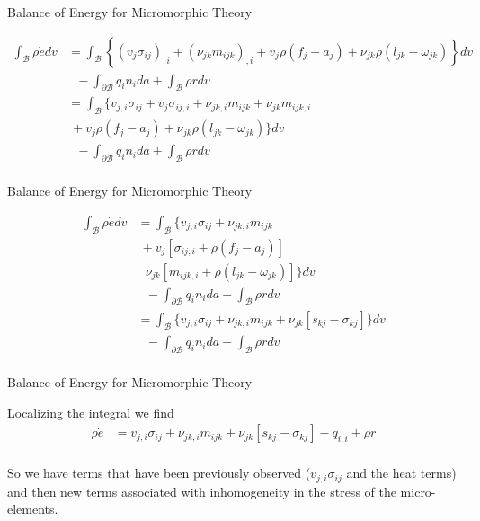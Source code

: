 \documentclass[11pt]{beamer}
\begin{document}
\begin{frame}{Balance of Energy for Micromorphic Theory}

\begin{align*}
\int_{\mathcal{B}} \rho \dot{e} dv &= \int_{\mathcal{B}}\left\{ \left(v_j \sigma_{ij}\right)_{,i} + \left(\nu_{jk} m_{ijk}\right)_{,i} + v_j \rho \left(f_j - a_j\right) + \nu_{jk}\rho\left( l_{jk} - \omega_{jk}\right) \right\}dv\\
&\ \ \  - \int_{\partial \mathcal{B}} q_i n_i da + \int_{\mathcal{B}}\rho r dv\\
&= \int_{\mathcal{B}}\bigg\{ v_{j,i} \sigma_{ij} + v_{j} \sigma_{ij,i} + \nu_{jk,i} m_{ijk} + \nu_{jk} m_{ijk,i}\\
&\ +v_j \rho \left(f_j - a_j\right) + \nu_{jk}\rho \left( l_{jk} - \omega_{jk}\right) \bigg\}dv\\
&\ \ \  - \int_{\partial \mathcal{B}} q_i n_i da + \int_{\mathcal{B}}\rho r dv\\
\end{align*}

\end{frame}

\begin{frame}{Balance of Energy for Micromorphic Theory}

\begin{align*}
\int_{\mathcal{B}} \rho \dot{e} dv &= \int_{\mathcal{B}}\bigg\{ v_{j,i} \sigma_{ij} + \nu_{jk,i} m_{ijk}\\
&\ +v_j \left[ \sigma_{ij,i} + \rho \left(f_j - a_j\right)\right]\\
&\ \ \ \nu_{jk} \left[m_{ijk,i} + \rho \left( l_{jk} - \omega_{jk}\right)\right] \bigg\}dv\\
&\ \ \  - \int_{\partial \mathcal{B}} q_i n_i da + \int_{\mathcal{B}}\rho r dv\\
&= \int_{\mathcal{B}}\bigg\{ v_{j,i} \sigma_{ij} + \nu_{jk,i} m_{ijk} + \nu_{jk} \left[s_{kj} - \sigma_{kj}\right] \bigg\}dv\\
&\ \ \  - \int_{\partial \mathcal{B}} q_i n_i da + \int_{\mathcal{B}}\rho r dv\\
\end{align*}

\end{frame}

\begin{frame}{Balance of Energy for Micromorphic Theory}

Localizing the integral we find
\begin{align*}
\rho \dot{e} &= v_{j,i} \sigma_{ij} + \nu_{jk,i} m_{ijk} + \nu_{jk}\left[s_{kj} - \sigma_{kj}\right] - q_{i,i} + \rho r\\
\end{align*}

So we have terms that have been previously observed ($v_{j,i} \sigma_{ij}$ and the heat terms) and then new terms associated with inhomogeneity in the stress of the micro-elements.

\end{frame}
\end{document}
